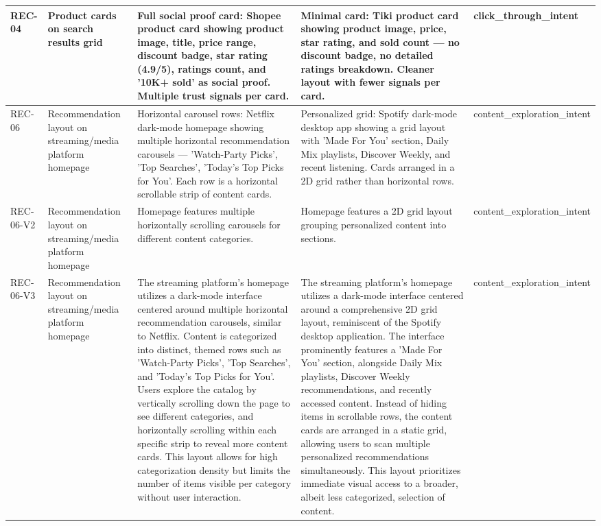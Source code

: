 \begin{table}[h]
\begin{tabular}{p{1.5cm} p{3.5cm} p{4cm} p{4cm} p{2cm}}
\midrule
REC-04 & Product cards on search results grid & Full social proof card: Shopee product card showing product image, title, price range, discount badge, star rating (4.9/5), ratings count, and '10K+ sold' as social proof. Multiple trust signals per card. & Minimal card: Tiki product card showing product image, price, star rating, and sold count — no discount badge, no detailed ratings breakdown. Cleaner layout with fewer signals per card. & click_through_intent \\
\midrule
REC-06 & Recommendation layout on streaming/media platform homepage & Horizontal carousel rows: Netflix dark-mode homepage showing multiple horizontal recommendation carousels — 'Watch-Party Picks', 'Top Searches', 'Today's Top Picks for You'. Each row is a horizontal scrollable strip of content cards. & Personalized grid: Spotify dark-mode desktop app showing a grid layout with 'Made For You' section, Daily Mix playlists, Discover Weekly, and recent listening. Cards arranged in a 2D grid rather than horizontal rows. & content_exploration_intent \\
\midrule
REC-06-V2 & Recommendation layout on streaming/media platform homepage & Homepage features multiple horizontally scrolling carousels for different content categories. & Homepage features a 2D grid layout grouping personalized content into sections. & content_exploration_intent \\
\midrule
REC-06-V3 & Recommendation layout on streaming/media platform homepage & The streaming platform's homepage utilizes a dark-mode interface centered around multiple horizontal recommendation carousels, similar to Netflix. Content is categorized into distinct, themed rows such as 'Watch-Party Picks', 'Top Searches', and 'Today's Top Picks for You'. Users explore the catalog by vertically scrolling down the page to see different categories, and horizontally scrolling within each specific strip to reveal more content cards. This layout allows for high categorization density but limits the number of items visible per category without user interaction. & The streaming platform's homepage utilizes a dark-mode interface centered around a comprehensive 2D grid layout, reminiscent of the Spotify desktop application. The interface prominently features a 'Made For You' section, alongside Daily Mix playlists, Discover Weekly recommendations, and recently accessed content. Instead of hiding items in scrollable rows, the content cards are arranged in a static grid, allowing users to scan multiple personalized recommendations simultaneously. This layout prioritizes immediate visual access to a broader, albeit less categorized, selection of content. & content_exploration_intent \\

\end{tabular}
\end{table}

